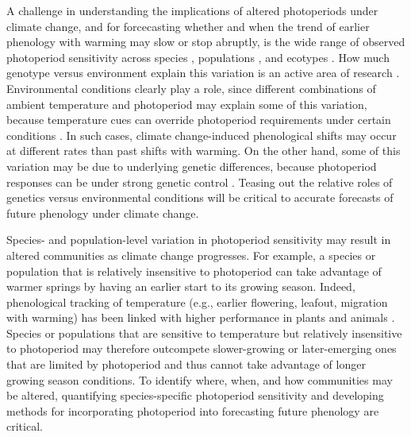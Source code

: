 \documentclass{article}
\begin{document}

 \par A challenge in understanding the implications of altered photoperiods under climate change, and for forcecasting whether and when the trend of earlier phenology with warming may slow or stop abruptly, is the wide range of observed photoperiod sensitivity across species \citep{flynn2018,Sanz-Perez:2009aa, zohner2016}, populations \citep{tanino2010}, and ecotypes \citep{Howe:1995aa}. How much genotype versus environment explain this variation is an active area of research \citep[e.g.,][]{franks2014,gould2010,mimura2010,frejaville2019}. Environmental conditions clearly play a role, since different combinations of ambient temperature and photoperiod may explain some of this variation, because temperature cues can override photoperiod requirements under certain conditions \citep [e.g.,][] {tanino2010}. In such cases, climate change-induced phenological shifts may occur at different rates than past shifts with warming. On the other hand, some of this variation may be due to underlying genetic differences, because photoperiod responses can be under strong genetic control \citep[][, see also Box 1]{bradshaw1995,keller2011,weih2004}. Teasing out the relative roles of genetics versus environmental conditions will be critical to accurate forecasts of future phenology under climate change.

\par Species- and population-level variation in photoperiod sensitivity may result in altered communities as climate change progresses. For example, a species or population that is relatively insensitive to photoperiod can take advantage of warmer springs by having an earlier start to its growing season. Indeed, phenological tracking of temperature (e.g., earlier flowering, leafout, migration with warming) has been linked with higher performance in plants and animals \citep{cleland2012,muir1994,willis2010}. Species or populations that are sensitive to temperature but relatively insensitive to photoperiod may therefore outcompete slower-growing or later-emerging ones that are limited by photoperiod and thus cannot take advantage of longer growing season conditions. To identify where, when, and how communities may be altered, quantifying species-specific photoperiod sensitivity and developing methods for incorporating photoperiod into forecasting future phenology are critical. 
\end{document}
